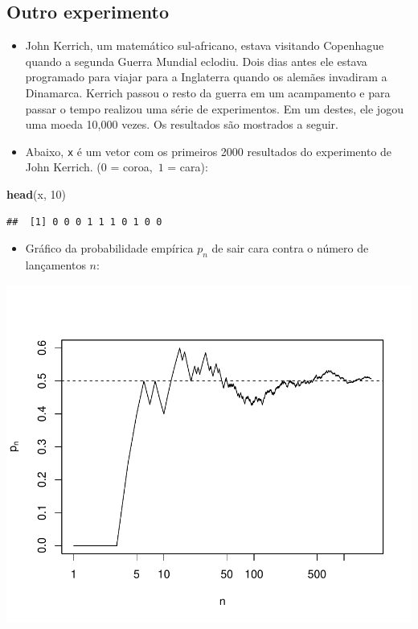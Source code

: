 \documentclass[]{article}
\newenvironment{Shaded}{\begin{snugshade}}{\end{snugshade}}
\newcommand{\KeywordTok}[1]{\textcolor[rgb]{0.13,0.29,0.53}{\textbf{#1}}}
\newcommand{\DecValTok}[1]{\textcolor[rgb]{0.00,0.00,0.81}{#1}}
\newcommand{\NormalTok}[1]{#1}
\providecommand{\tightlist}{%
  \setlength{\itemsep}{0pt}\setlength{\parskip}{0pt}}
\begin{document}
\subsection{Outro experimento}\label{outro-experimento}

\begin{itemize}
\tightlist
\item
  John Kerrich, um matemático sul-africano, estava visitando Copenhague
  quando a segunda Guerra Mundial eclodiu. Dois dias antes ele estava
  programado para viajar para a Inglaterra quando os alemães invadiram a
  Dinamarca. Kerrich passou o resto da guerra em um acampamento e para
  passar o tempo realizou uma série de experimentos. Em um destes, ele
  jogou uma moeda 10,000 vezes. Os resultados são mostrados a seguir.
\item
  Abaixo, \texttt{x} é um vetor com os primeiros 2000 resultados do
  experimento de John Kerrich. (0 = coroa,~\(1\) = cara):
\end{itemize}

\begin{Shaded}
\begin{Highlighting}[]
\KeywordTok{head}\NormalTok{(x, }\DecValTok{10}\NormalTok{)}
\end{Highlighting}
\end{Shaded}

\begin{verbatim}
##  [1] 0 0 0 1 1 1 0 1 0 0
\end{verbatim}

\begin{itemize}
\tightlist
\item
  Gráfico da probabilidade empírica \(p_n\) de sair cara contra o número
  de lançamentos \(n\):
\end{itemize}

\begin{center}\includegraphics{probability_files/figure-latex/unnamed-chunk-7-1} \end{center}
\end{document}
